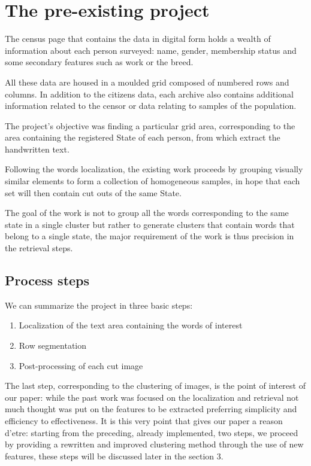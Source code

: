 \section{The pre-existing project}

The census page that contains the data in digital form holds a wealth of information about each person surveyed: name, gender, membership status and some secondary features such as work or the breed. 

All these data are housed in a moulded grid composed of numbered rows and columns. In addition to the citizens data, each archive also contains additional information related to the censor or data relating to samples of the population.

The project's objective was finding a particular grid area, corresponding to the area containing the registered State of each person, from which extract the handwritten text.

Following the words localization, the existing work proceeds by grouping visually similar elements to form a collection of homogeneous samples, in hope that each set will then contain cut outs of the same State.

The goal of the work is not to group all the words corresponding to the same state in a single cluster but rather to generate clusters that contain words that belong to a single state, the major requirement of the work is thus precision in the retrieval steps.

\subsection{Process steps}

We can summarize the project in three basic steps:
\begin{enumerate}
\item Localization of the text area containing the words of interest
\item Row segmentation
\item Post-processing of each cut image
\end{enumerate}

The last step, corresponding to the clustering of images, is the point of interest of our paper: while the past work was focused on the localization and retrieval not much thought was put on the features to be extracted preferring simplicity and efficiency to effectiveness.
It is this very point that gives our paper a reason d'etre: starting from the preceding, already implemented, two steps, we proceed by providing a rewritten and improved clustering method through the use of new features, these steps will be discussed later in the section 3.


